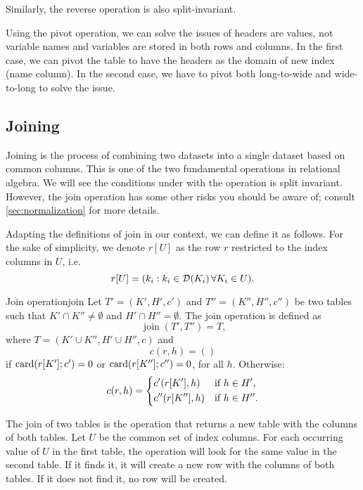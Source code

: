 Similarly, the reverse operation is also split-invariant.

Using the pivot operation, we can solve the issues of headers are values, not variable
names and variables are stored in both rows and columns.  In the first case, we can pivot
the table to have the headers as the domain of new index (name column).  In the second
case, we have to pivot both long-to-wide and wide-to-long to solve the issue.

\subsection{Joining}

Joining is the process of combining two datasets into a single dataset based on common
columns.  This is one of the two fundamental operations in relational algebra. We will see
the conditions under with the operation is split invariant. However, the join operation
has some other risks you should be aware of; consult \cref{sec:normalization} for more
details.

Adapting the definitions of join in our context, we can define it as follows.
For the sake of simplicity, we denote $r[U]$ as the row $r$ restricted to the index
columns in $U$, i.e.
\begin{equation*}
  r[U] = (k_i : k_i \in \domainof{K_i} \forall K_i \in U)\text{.}
\end{equation*}

\begin{defbox}{Join operation}{join}
  Let $T' = (K', H', c')$ and $T'' = (K'', H'', c'')$ be two tables such that $K'
  \cap K'' \neq \emptyset$ and $H' \cap H'' = \emptyset$.  The join operation is
  defined as \[
    \operatorname{join}(T', T'') = T\text{,}
  \] where $T = (K' \cup K'', H' \cup H'', c)$ and \[
    c(r, h) = ()
  \] if $\rowcard[{r[K']; c'}] = 0$ or $\rowcard[{r[K'']; c''}] = 0$, for all $h$.
  Otherwise: \[
    c(r, h) = \begin{dcases}
      c'(r[K'], h) & \text{if } h \in H'\text{,} \\
      c''(r[K''], h) & \text{if } h \in H''\text{.}
    \end{dcases}
  \]
\end{defbox}

The join of two tables is the operation that returns a new table with the columns of both
tables.  Let $U$ be the common set of index columns.  For each occurring value of $U$ in
the first table, the operation will look for the same value in the second table.  If it
finds it, it will create a new row with the columns of both tables.  If it does not find
it, no row will be created.

